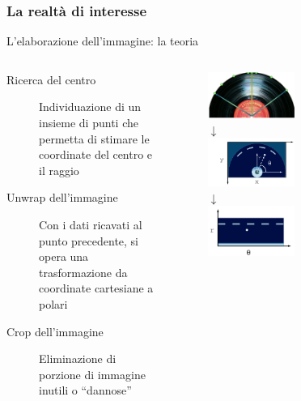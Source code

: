 \begin{frame}
\frametitle{La realtà di interesse}
\begin{block}{L'elaborazione dell'immagine: la teoria}
\begin{columns}[t]
\begin{column}{6.5cm}
\begin{description}
\item[Ricerca del centro] Individuazione di un insieme di punti che permetta 
di stimare le coordinate del centro e il raggio
\item[Unwrap dell'immagine] Con i dati ricavati al punto precedente, si
opera una trasformazione da coordinate cartesiane a polari
\item[Crop dell'immagine] Eliminazione di porzione di immagine inutili o
``dannose''
\end{description}
\end{column}
\vline
\begin{column}{3.5cm}
\begin{figure}
\includegraphics[width=0.5\textwidth]{immagini/center.png}\\
$\downarrow$\\
\includegraphics[width=0.5\textwidth]{immagini/cartesio.png}\\
$\downarrow$\\
\vspace{.2cm}
\includegraphics[width=0.5\textwidth]{immagini/polare.png}
\end{figure}
\end{column}
\end{columns}
\end{block}
\end{frame}

